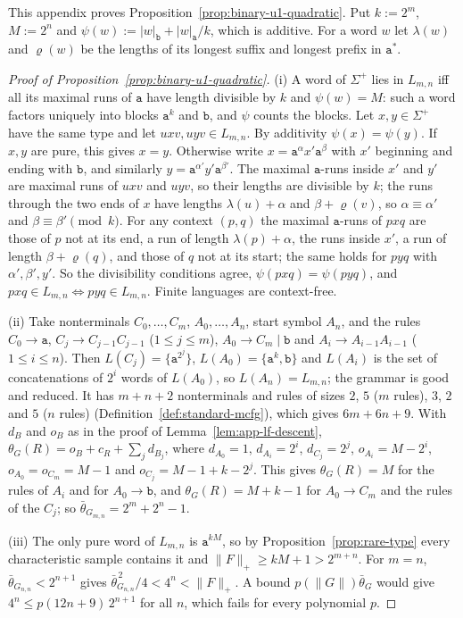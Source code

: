This appendix proves Proposition~\ref{prop:binary-u1-quadratic}.  Put
$k:=2^m$, $M:=2^n$ and $\psi(w):=|w|_{\mathtt b}+|w|_{\mathtt a}/k$, which is
additive.  For a word $w$ let $\lambda(w)$ and $\varrho(w)$ be the lengths of its
longest suffix and longest prefix in $\mathtt a^*$.

\begin{proof}[Proof of Proposition~\ref{prop:binary-u1-quadratic}]
(i) A word of $\Sigma^+$ lies in $L_{m,n}$ iff all its maximal runs of $\mathtt a$
have length divisible by $k$ and $\psi(w)=M$: such a word factors uniquely into
blocks $\mathtt a^k$ and $\mathtt b$, and $\psi$ counts the blocks.  Let
$x,y\in\Sigma^+$ have the same type and let $uxv,uyv\in L_{m,n}$.  By additivity
$\psi(x)=\psi(y)$.  If $x,y$ are pure, this gives $x=y$.  Otherwise write
$x=\mathtt a^{\alpha}x'\mathtt a^{\beta}$ with $x'$ beginning and ending with
$\mathtt b$, and similarly $y=\mathtt a^{\alpha'}y'\mathtt a^{\beta'}$.  The maximal
$\mathtt a$-runs inside $x'$ and $y'$ are maximal runs of $uxv$ and $uyv$, so their
lengths are divisible by $k$; the runs through the two ends of $x$ have lengths
$\lambda(u)+\alpha$ and $\beta+\varrho(v)$, so $\alpha\equiv\alpha'$ and
$\beta\equiv\beta'\pmod k$.  For any context $(p,q)$ the maximal $\mathtt a$-runs of
$pxq$ are those of $p$ not at its end, a run of length $\lambda(p)+\alpha$, the
runs inside $x'$, a run of length $\beta+\varrho(q)$, and those of $q$ not at its
start; the same holds for $pyq$ with $\alpha',\beta',y'$.  So the divisibility
conditions agree, $\psi(pxq)=\psi(pyq)$, and $pxq\in L_{m,n}\iff pyq\in L_{m,n}$.
Finite languages are context-free.

(ii) Take nonterminals $C_0,\ldots,C_m$, $A_0,\ldots,A_n$, start symbol $A_n$, and the
rules $C_0\to\mathtt a$, $C_j\to C_{j-1}C_{j-1}$ ($1\le j\le m$),
$A_0\to C_m\mid\mathtt b$ and $A_i\to A_{i-1}A_{i-1}$ ($1\le i\le n$).  Then
$L(C_j)=\{\mathtt a^{2^j}\}$, $L(A_0)=\{\mathtt a^k,\mathtt b\}$ and $L(A_i)$ is the
set of concatenations of $2^i$ words of $L(A_0)$, so $L(A_n)=L_{m,n}$; the grammar
is good and reduced.  It has $m+n+2$ nonterminals and rules of sizes $2$, $5$
($m$ rules), $3$, $2$ and $5$ ($n$ rules) (Definition~\ref{def:standard-mcfg}),
which gives $6m+6n+9$.  With $d_B$ and $o_B$ as in the proof of
Lemma~\ref{lem:app-lf-descent}, $\theta_G(R)=o_B+c_R+\sum_jd_{B_j}$, where
$d_{A_0}=1$, $d_{A_i}=2^i$, $d_{C_j}=2^j$, $o_{A_i}=M-2^i$, $o_{A_0}=o_{C_m}=M-1$ and
$o_{C_j}=M-1+k-2^j$.  This gives $\theta_G(R)=M$ for the rules of $A_i$ and for
$A_0\to\mathtt b$, and $\theta_G(R)=M+k-1$ for $A_0\to C_m$ and the rules of the
$C_j$; so $\bar\theta_{G_{m,n}}=2^m+2^n-1$.

(iii) The only pure word of $L_{m,n}$ is $\mathtt a^{kM}$, so by
Proposition~\ref{prop:rare-type} every characteristic sample contains it and
$\|F\|_+\ge kM+1>2^{m+n}$.  For $m=n$, $\bar\theta_{G_{n,n}}<2^{n+1}$ gives
$\bar\theta_{G_{n,n}}^{\,2}/4<4^n<\|F\|_+$.  A bound $p(\|G\|)\bar\theta_G$ would give
$4^n\le p(12n+9)\,2^{n+1}$ for all $n$, which fails for every polynomial $p$.
\end{proof}

